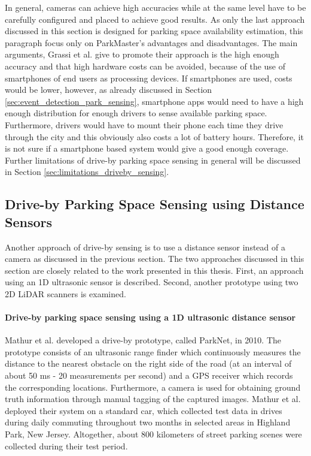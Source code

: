 In general, cameras can achieve high accuracies while at the same level have to be carefully configured and placed to achieve good results.
As only the last approach discussed in this section is designed for parking space availability estimation, this paragraph focus only on ParkMaster's advantages and disadvantages. The main arguments, Grassi et al. give to promote their approach is the high enough accuracy and that high hardware costs can be avoided, because of the use of smartphones of end users as processing devices. If smartphones are used, costs would be lower, however, as already discussed in Section \ref{sec:event_detection_park_sensing}, smartphone apps would need to have a high enough distribution for enough drivers to sense available parking space. Furthermore, drivers would have to mount their phone each time they drive through the city and this obviously also costs a lot of battery hours. Therefore, it is not sure if a smartphone based system would give a good enough coverage. Further limitations of drive-by parking space sensing in general will be discussed in Section \ref{sec:limitations_driveby_sensing}.





\subsection{Drive-by Parking Space Sensing using Distance Sensors}
\label{sec:related_driveby_park_sensing_distance}

Another approach of drive-by sensing is to use a distance sensor instead of a camera as discussed in the previous section. The two approaches discussed in this section are closely related to the work presented in this thesis. First, an approach using an 1D ultrasonic sensor is described. Second, another prototype using two 2D LiDAR scanners is examined.

\paragraph{Drive-by parking space sensing using a 1D ultrasonic distance sensor}

Mathur et al. \cite{Mathur:2010:PDS:1814433.1814448} developed a drive-by prototype, called ParkNet, in 2010. The prototype consists of an ultrasonic range finder which continuously measures the distance to the nearest obstacle on the right side of the road (at an interval of about 50 ms - 20 measurements per second) and a GPS receiver which records the corresponding locations. Furthermore, a camera is used for obtaining ground truth information through manual tagging of the captured images. Mathur et al. deployed their system on a standard car, which collected test data in drives during daily commuting throughout two months in selected areas in Highland Park, New Jersey. Altogether, about 800 kilometers of street parking scenes were collected during their test period.

